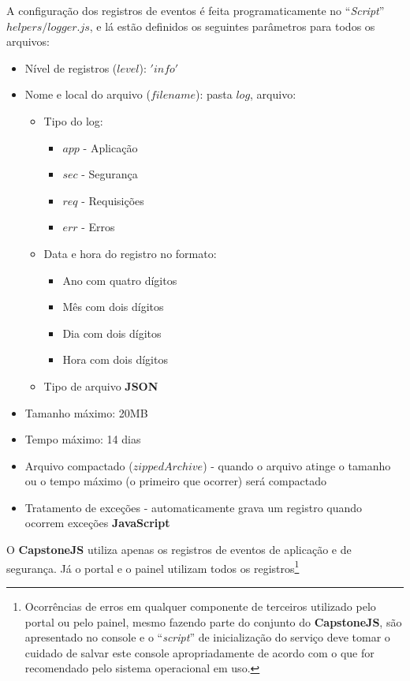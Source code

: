 A configuração dos registros de eventos é feita programaticamente no ``\textit{Script}'' $helpers/logger.js$, e lá estão definidos os seguintes parâmetros para todos os arquivos:

\begin{itemize}
    \item Nível de registros ($level$): $'info'$
    \item Nome e local do arquivo ($filename$): pasta $log$, arquivo:
        \begin{itemize}
            \item Tipo do log:
                \begin{itemize}
                    \item $app$ - Aplicação
                    \item $sec$ - Segurança
                    \item $req$ - Requisições
                    \item $err$ - Erros
                \end{itemize}
            \item Data e hora do registro no formato:
                \begin{itemize}
                    \item Ano com quatro dígitos
                    \item Mês com dois dígitos
                    \item Dia com dois dígitos
                    \item Hora com dois dígitos
                \end{itemize}
            \item Tipo de arquivo \textbf{JSON}
        \end{itemize}
    \item Tamanho máximo: 20MB
    \item Tempo máximo: 14 dias
    \item Arquivo compactado ($zippedArchive$) - quando o arquivo atinge o tamanho ou o tempo máximo (o primeiro que ocorrer) será compactado
    \item Tratamento de exceções - automaticamente grava um registro quando ocorrem exceções \textbf{JavaScript}
\end{itemize}

O \textbf{CapstoneJS} utiliza apenas os registros de eventos de aplicação e de segurança. Já o portal e o painel utilizam todos os registros\footnote{Ocorrências de erros em qualquer componente de terceiros utilizado pelo portal ou pelo painel, mesmo fazendo parte do conjunto do \textbf{CapstoneJS}, são apresentado no console e o ``\textit{script}'' de inicialização do serviço deve tomar o cuidado de salvar este console apropriadamente de acordo com o que for recomendado pelo sistema operacional em uso.}